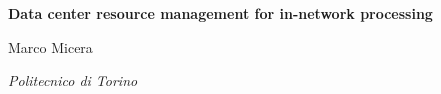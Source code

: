 \Large{\textbf{Data center resource management for in-network processing}}

Marco Micera\par
\textit{Politecnico di Torino}